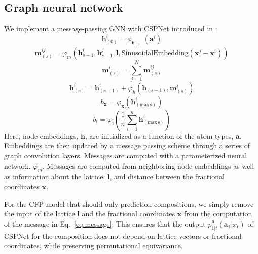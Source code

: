 \subsection{Graph neural network} \label{app:cspnet}
We implement a message-passing GNN with CSPNet introduced in \citet{jiao_crystal_2023}:
\begin{equation}
    \bm{h}^i_{(0)} = \phi_{\bm{h}_{(0)}} (\bm{a}^i)
\end{equation}
\begin{equation}
\label{eq:message}
    \bm{m}_{(s)}^{ij} = \varphi_m \left( \bm{h}^i_{s-1}, \bm{h}^j_{s-1}, \bm{l}, \mathrm{SinusoidalEmbedding}(\bm{x}^j - \bm{x}^i) \right)
\end{equation}
\begin{equation}
    \bm{m}_{(s)}^i = \sum_{j=1}^N \bm{m}^{ij}_{(s)}
\end{equation}
\begin{equation}
    \bm{h}_{(s)}^i = \bm{h}_{(s-1)}^i + \varphi_h(\bm{h}_{(s-1)}, \bm{m}_{(s)}^i)
\end{equation}
\begin{equation}
    b_{\bm{x}} = \varphi_{\bm{x}} \left( \bm{h}^i_{(\mathrm{max \, s})} \right)
\end{equation}
\begin{equation}
    b_{\bm{l}} = \varphi_{\bm{l}} \left( \frac{1}{n} \sum_{i=1}^n \bm{h}^i_{(\mathrm{max \, s})} \right)
\end{equation}
Here, node embeddings, $\bm{h}$, are initialized as a function of the atom types, $\bm{a}$. Embeddings are then updated by a message passing scheme through a series of graph convolution layers. Messages are computed with a parameterized neural network, $\varphi_m$. Messages are computed from neighboring node embeddings as well as information about the lattice, $\bm{l}$, and distance between the fractional coordinates $\bm{x}$. 

For the CFP model that should only prediction compositions, we simply remove the input of the lattice $\bm{l}$ and the fractional coordinates $\bm{x}$ from the computation of the message in Eq.~\ref{eq:message}. This ensures that the output $p_{1|t}^\theta(\bm{a}_1|x_t)$ of CSPNet for the composition does not depend on lattice vectors or fractional coordinates, while preserving permutational equivariance.

